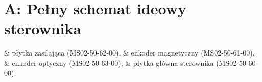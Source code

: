 \section*{A: Pełny schemat ideowy sterownika}

\begin{easylist}
	& płytka zasilająca (MS02-50-62-00),
	& enkoder magnetyczny (MS02-50-61-00),
	& enkoder optyczny (MS02-50-63-00),
	& płytka główna sterownika (MS02-50-60-00).
\end{easylist}	






\clearpage